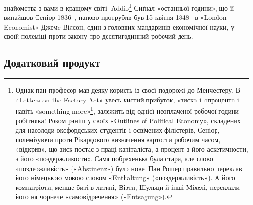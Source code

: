 \parcont{}  %
знайомства з вами в кращому світі. Addio\footnote{
Однак пан професор мав деяку користь із своєї подорожі до Менчестеру.
В «Letters on the Factory Act» увесь чистий прибуток, «зиск» і «процент» і
навіть «something more»\footnote*{
щось більше. \emph{Ред}.
}, залежить від
однієї неоплаченої
робочої години робітника! Роком раніш у своїх «Outlines of Political Economy»,
складених для насолоди оксфордських студентів і освічених філістерів, Сеніор,
полемізуючи проти Рікардового визначення вартости робочим часом, «відкрив», що
зиск постає з праці капіталіста, а процент з його
аскетичности, з його «поздержливости». Сама побрехенька була стара, але слово
«поздержливість» («Abstinenz») було нове. Пан Рошер правильно переклав його
німецькою мовою словом «Enthaltung» («поздержливість»). А його компатріоти,
менше биті в латині, Вірти, Шульци
й інші Міхелі, переклали його на чорнече «самовідречення» («Entsagung»).
} Сиґнал «останньої години», що її винайшов Сеніор 1836~, наново протрубив
був 15 квітня 1848~ в «London Economist» Джемc Вілсон, один з головних
мандаринів економічної науки, у своїй полеміці проти
закону про десятигодинний робочий день.

\manualpagebreak{}
\subsection{Додатковий продукт}

